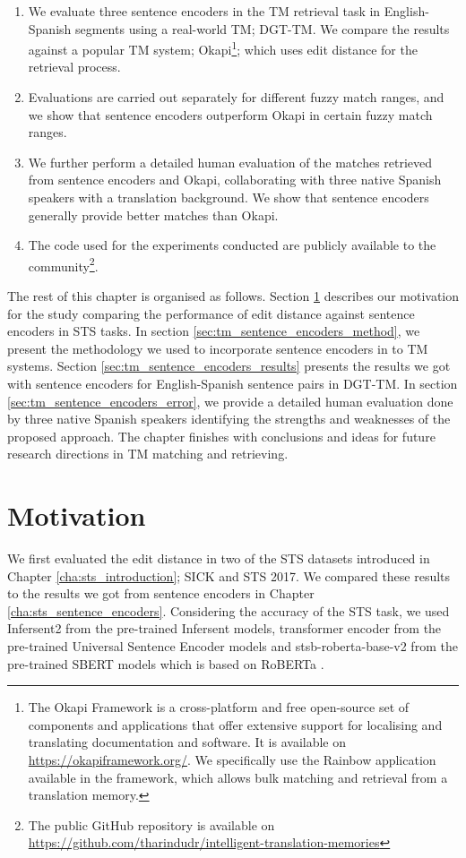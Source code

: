 \begin{enumerate}
	\item We evaluate three sentence encoders in the TM retrieval task in English-Spanish segments using a real-world TM; DGT-TM. We compare the results against a popular TM system; Okapi\footnote{The Okapi Framework is a cross-platform and free open-source set of components and applications that offer extensive support for localising and translating documentation and software. It is available on \url{https://okapiframework.org/}. We specifically use the Rainbow application available in the framework, which allows bulk matching and retrieval from a translation memory.}; which uses edit distance for the retrieval process.
	
	\item Evaluations are carried out separately for different fuzzy match ranges, and we show that sentence encoders outperform Okapi in certain fuzzy match ranges.
	
	\item We further perform a detailed human evaluation of the matches retrieved from sentence encoders and Okapi, collaborating with three native Spanish speakers with a translation background. We show that sentence encoders generally provide better matches than Okapi.
	
	\item The code used for the experiments conducted are publicly available to the community\footnote{The public GitHub repository is available on \url{https://github.com/tharindudr/intelligent-translation-memories}}.
\end{enumerate}

The rest of this chapter is organised as follows. Section \ref{sec:tm_sentence_encoders_motivation} describes our motivation for the study comparing the performance of edit distance against sentence encoders in STS tasks. In section \ref{sec:tm_sentence_encoders_method}, we present the methodology we used to incorporate sentence encoders in to TM systems. Section \ref{sec:tm_sentence_encoders_results} presents the results we got with sentence encoders for English-Spanish sentence pairs in DGT-TM. In section \ref{sec:tm_sentence_encoders_error}, we provide a detailed human evaluation done by three native Spanish speakers identifying the strengths and weaknesses of the proposed approach. The chapter finishes with conclusions and ideas for future research directions in TM matching and retrieving.


\section{Motivation}
\label{sec:tm_sentence_encoders_motivation}
We first evaluated the edit distance in two of the STS datasets introduced in Chapter \ref{cha:sts_introduction}; SICK and STS 2017. We compared these results to the results we got from sentence encoders in Chapter \ref{cha:sts_sentence_encoders}. Considering the accuracy of the STS task, we used Infersent2 from the pre-trained Infersent models, transformer encoder from the pre-trained Universal Sentence Encoder models and stsb-roberta-base-v2 from the pre-trained SBERT models which is based on RoBERTa \autocite{liu2019roberta}. 

